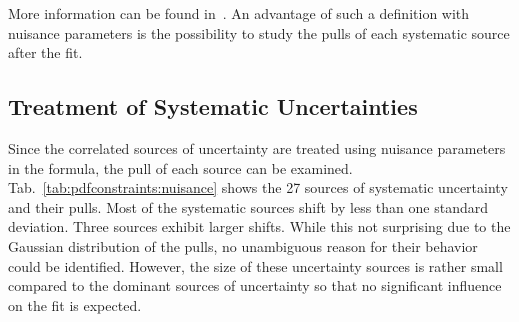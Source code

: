 More information can be found in~\cite{Alekhin:2014irh,Abramowicz:2015mha}. An
advantage of such a \chisq definition with nuisance parameters is the
possibility to study the pulls of each systematic source after the fit.

\subsection{Treatment of Systematic Uncertainties}
\label{section:cmsdatauncertainties}

Since the correlated sources of uncertainty are treated using nuisance
parameters in the \chisq formula, the pull of each source can be examined.
Tab.~\ref{tab:pdfconstraints:nuisance} shows the 27 sources of systematic
uncertainty and their pulls. Most of the systematic sources shift by less than
one standard deviation. Three sources exhibit larger shifts. While this not
surprising due to the Gaussian distribution of the pulls, no unambiguous
reason for their behavior could be identified. However, the size of these
uncertainty sources is rather small compared to the dominant sources of
uncertainty so that no significant influence on the fit is expected.

